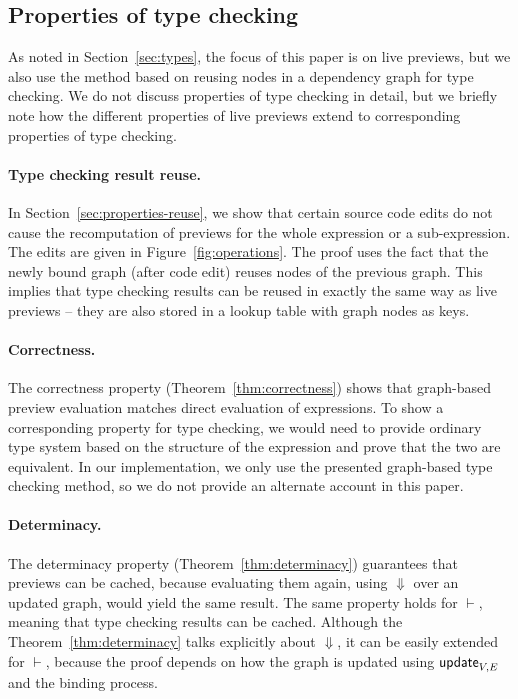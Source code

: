 \documentclass[sigplan,10pt]{acmart}\settopmatter{printfolios=true,printccs=false,printacmref=false}
\theoremstyle{plain}
\theoremstyle{definition}
\newcommand{\ident}[1]{\textnormal{\sffamily #1}}
\begin{document}

\subsection{Properties of type checking}

As noted in Section~\ref{sec:types}, the focus of this paper is on live previews, but we also
use the method based on reusing nodes in a dependency graph for type checking. We do not discuss 
properties of type checking in detail, but we briefly note how the different properties of 
live previews extend to corresponding properties of type checking.

\paragraph{Type checking result reuse.} In Section~\ref{sec:properties-reuse}, we show that 
certain source code edits do not cause the recomputation of previews for the whole expression
or a sub-expression. The edits are given in Figure~\ref{fig:operations}. The proof uses the fact
that the newly bound graph (after code edit) reuses nodes of the previous graph. This implies that
type checking results can be reused in exactly the same way as live previews -- they are also 
stored in a lookup table with graph nodes as keys.

\paragraph{Correctness.} The correctness property (Theorem~\ref{thm:correctness}) shows that 
graph-based preview evaluation matches direct evaluation of expressions. To show a corresponding
property for type checking, we would need to provide ordinary type system based on the structure
of the expression and prove that the two are equivalent. In our implementation, we only use the
presented graph-based type checking method, so we do not provide an alternate account in this paper.

\paragraph{Determinacy.} The determinacy property (Theorem~\ref{thm:determinacy}) guarantees that
previews can be cached, because evaluating them again, using $\Downarrow$ over an updated graph, 
would yield the same result. The same property holds for $\vdash$, meaning that type checking 
results can be cached. Although the Theorem~\ref{thm:determinacy} talks explicitly about 
$\Downarrow$, it can be easily extended for $\vdash$, because the proof depends on how the graph
is updated using $\ident{update}_{V,E}$ and the binding process.
\end{document}
